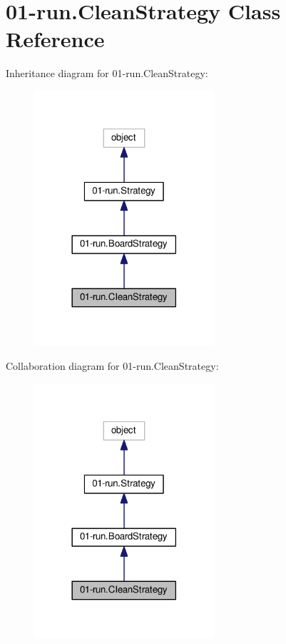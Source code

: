 \hypertarget{class01-run_1_1CleanStrategy}{}\section{01-\/run.Clean\+Strategy Class Reference}
\label{class01-run_1_1CleanStrategy}


Inheritance diagram for 01-\/run.Clean\+Strategy\+:
\nopagebreak
\begin{figure}[H]
\begin{center}
\leavevmode
\includegraphics[width=189pt]{class01-run_1_1CleanStrategy__inherit__graph}
\end{center}
\end{figure}


Collaboration diagram for 01-\/run.Clean\+Strategy\+:
\nopagebreak
\begin{figure}[H]
\begin{center}
\leavevmode
\includegraphics[width=189pt]{class01-run_1_1CleanStrategy__coll__graph}
\end{center}
\end{figure}
